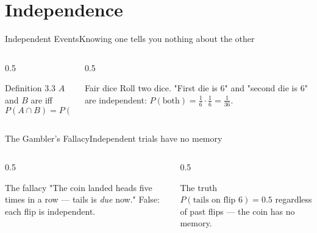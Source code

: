 \documentclass[aspectratio=169,11pt]{beamer}
\begin{document}
\section{Independence}

\begin{frame}{Independent Events}{Knowing one tells you nothing about the other}
  \begin{columns}[T]
    \begin{column}{0.5\textwidth}
      \begin{block}{Definition 3.3}
        \small $A$ and $B$ are  iff
        \[ P(A \cap B) = P(A)\,P(B) \]
      \end{block}
    \end{column}
    \begin{column}{0.5\textwidth}
      \begin{exampleblock}{Fair dice}
        \small Roll two dice. "First die is 6" and "second die is 6" are
        independent: $P(\text{both}) = \tfrac16\cdot\tfrac16 = \tfrac1{36}$.
      \end{exampleblock}
    \end{column}
  \end{columns}
\end{frame}

\begin{frame}{The Gambler's Fallacy}{Independent trials have no memory}
  \begin{columns}[T]
    \begin{column}{0.5\textwidth}
      \begin{alertblock}{The fallacy}
        \small "The coin landed heads five times in a row — tails is
        \emph{due} now." False: each flip is independent.
      \end{alertblock}
    \end{column}
    \begin{column}{0.5\textwidth}
      \begin{exampleblock}{The truth}
        \small $P(\text{tails on flip } 6) = 0.5$ regardless of past flips —
        the coin has no memory.
      \end{exampleblock}
    \end{column}
  \end{columns}
\end{frame}
\end{document}
